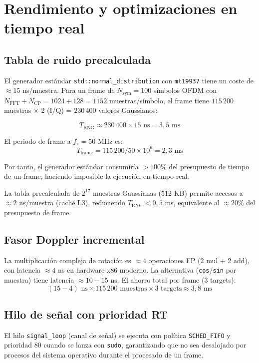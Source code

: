 \documentclass[11pt,a4paper]{article}
\begin{document}
\section{Rendimiento y optimizaciones en tiempo real}

\subsection{Tabla de ruido precalculada}

El generador estándar \texttt{std::normal\_distribution} con \texttt{mt19937} tiene
un coste de $\approx 15$ ns/muestra. Para un frame de $N_\text{sym} = 100$ símbolos
OFDM con $N_\text{FFT} + N_\text{CP} = 1024 + 128 = 1152$ muestras/símbolo, el frame
tiene $115\,200$ muestras × 2 (I/Q) = $230\,400$ valores Gaussianos:

\[
  T_\text{RNG} \approx 230\,400 \times 15 \text{ ns} = 3{,}5 \text{ ms}
\]

El periodo de frame a $f_s = 50$ MHz es:
\[
  T_\text{frame} = 115\,200 / 50 \times 10^6 = 2{,}3 \text{ ms}
\]

Por tanto, el generador estándar consumiría $>100\%$ del presupuesto de tiempo de
un frame, haciendo imposible la ejecución en tiempo real.

La tabla precalculada de $2^{17}$ muestras Gaussianas (512 KB) permite accesos a
$\approx 2$ ns/muestra (caché L3), reduciendo $T_\text{RNG} < 0{,}5$ ms, equivalente
al $\approx 20\%$ del presupuesto de frame.

\subsection{Fasor Doppler incremental}

La multiplicación compleja de rotación es $\approx 4$ operaciones FP (2 mul + 2 add),
con latencia $\approx 4$ ns en hardware x86 moderno. La alternativa (\texttt{cos}/\texttt{sin}
por muestra) tiene latencia $\approx 10-15$ ns. El ahorro total por frame (3 targets):
\[
  (15 - 4) \text{ ns} \times 115\,200 \text{ muestras} \times 3 \text{ targets}
  \approx 3{,}8 \text{ ms}
\]

\subsection{Hilo de señal con prioridad RT}

El hilo \texttt{signal\_loop} (canal de señal) se ejecuta con política
\texttt{SCHED\_FIFO} y prioridad 80 cuando se lanza con \texttt{sudo},
garantizando que no sea desalojado por procesos del sistema operativo
durante el procesado de un frame.
\end{document}
